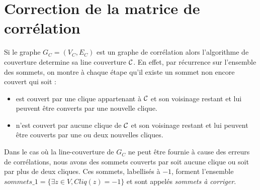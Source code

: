 %
%
% 
%
%
%
% 
%

\section{Correction de la matrice de corr\'elation}
Si le graphe $G_C=(V_C, E_C)$ est un graphe de corr\'elation alors l'algorithme de couverture determine sa line couverture $\cal C$.
En effet, par r\'ecurrence sur l'ensemble des sommets, on montre \`a chaque \'etape qu'il existe un sommet non encore couvert qui soit :
\begin{itemize}
\item  est couvert par une clique appartenant \`a $\cal C$ et son voisinage restant et lui peuvent \^etre converts par une nouvelle clique.
\item n'est couvert par aucune clique de  $\cal C$ et son voisinage restant et lui peuvent \^etre couverts par une ou deux nouvelles cliques.
\end{itemize}
Dans le cas o\`u la line-couverture de $G_C$ ne peut \^etre fournie \`a cause des erreurs de corr\'elations, nous avons des sommets couverts par soit aucune clique ou soit par plus de deux cliques. Ces sommets, labellis\'es \`a $-1$, forment l'ensemble 
$sommets\_1 = \{\exists z \in V, Cliq(z) = -1 \}$ 
et sont appel\'es {\em sommets \`a corriger}.
\newline

